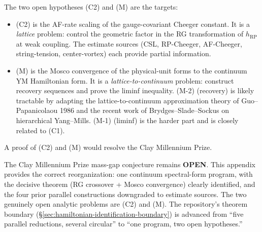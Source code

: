 \begin{remark}
\label{rem:shortest_route}
The two open hypotheses (C2) and (M) are the targets:
\begin{itemize}
\item (C2) is the AF-rate scaling of the gauge-covariant Cheeger
constant. It is a \emph{lattice} problem: control the geometric
factor in the RG transformation of $h_{\mathrm{RP}}$ at weak
coupling. The estimate sources (CSL, RP-Cheeger, AF-Cheeger,
string-tension, center-vortex) each provide partial information.
\item (M) is the Mosco convergence of the physical-unit forms to
the continuum YM Hamiltonian form. It is a
\emph{lattice-to-continuum} problem: construct recovery sequences
and prove the liminf inequality. (M-2) (recovery) is likely
tractable by adapting the lattice-to-continuum approximation
theory of Guo--Papanicolaou 1986 and the recent work of
Brydges--Slade--Sockus on hierarchical Yang--Mills. (M-1) (liminf)
is the harder part and is closely related to (C1).
\end{itemize}
A proof of (C2) and (M) would resolve the Clay Millennium Prize.
\end{remark}

\begin{remark}
\label{rem:spf_verdict}
The Clay Millennium Prize mass-gap conjecture remains
\textbf{OPEN}. This appendix provides the correct reorganization:
one continuum spectral-form program, with the decisive theorem
(RG crossover + Mosco convergence) clearly identified, and the
four prior parallel constructions downgraded to estimate sources.
The two genuinely open analytic problems are (C2) and (M). The
repository's theorem boundary
(\S\ref{sec:hamiltonian-identification-boundary}) is advanced
from ``five parallel reductions, several circular'' to ``one
program, two open hypotheses.''
\end{remark}

\endinput
